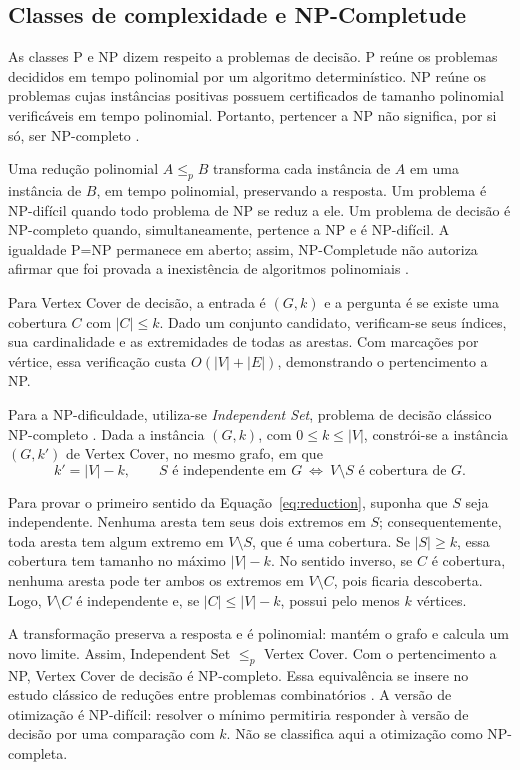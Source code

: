 \subsection{Classes de complexidade e NP-Completude}

As classes P e NP dizem respeito a problemas de decisão. P reúne os
problemas decididos em tempo polinomial por um algoritmo determinístico.
NP reúne os problemas cujas instâncias positivas possuem certificados de
tamanho polinomial verificáveis em tempo polinomial. Portanto, pertencer
a NP não significa, por si só, ser NP-completo \cite{garey1979,cormen2022}.

Uma redução polinomial $A\leq_p B$ transforma cada instância de $A$ em uma
instância de $B$, em tempo polinomial, preservando a resposta.
Um problema é NP-difícil quando todo problema de NP se reduz a ele.
Um problema de decisão é NP-completo quando, simultaneamente, pertence
a NP e é NP-difícil. A igualdade P=NP permanece em aberto; assim,
NP-Completude não autoriza afirmar que foi provada a inexistência de
algoritmos polinomiais \cite{garey1979}.

Para Vertex Cover de decisão, a entrada é $(G,k)$ e a pergunta é se existe
uma cobertura $C$ com $|C|\leq k$. Dado um conjunto candidato,
verificam-se seus índices, sua cardinalidade e as extremidades de todas
as arestas. Com marcações por vértice, essa verificação custa
$O(|V|+|E|)$, demonstrando o pertencimento a NP.

Para a NP-dificuldade, utiliza-se \emph{Independent Set}, problema de
decisão clássico NP-completo \cite{garey1979}. Dada a instância $(G,k)$,
com $0\leq k\leq |V|$, constrói-se a instância $(G,k')$ de Vertex Cover,
no mesmo grafo, em que
\begin{equation}
  k'=|V|-k,\qquad
  S\text{ é independente em }G
  \ \Longleftrightarrow\
  V\setminus S\text{ é cobertura de }G .
  \label{eq:reduction}
\end{equation}

Para provar o primeiro sentido da Equação~\eqref{eq:reduction},
suponha que $S$ seja independente.
Nenhuma aresta tem seus dois extremos em $S$; consequentemente, toda
aresta tem algum extremo em $V\setminus S$, que é uma cobertura.
Se $|S|\geq k$, essa cobertura tem tamanho no máximo $|V|-k$.
No sentido inverso, se $C$ é cobertura, nenhuma aresta pode ter ambos
os extremos em $V\setminus C$, pois ficaria descoberta. Logo,
$V\setminus C$ é independente e, se $|C|\leq |V|-k$, possui pelo menos
$k$ vértices.

A transformação preserva a resposta e é polinomial: mantém o grafo e
calcula um novo limite. Assim,
Independent Set $\leq_p$ Vertex Cover. Com o pertencimento a NP,
Vertex Cover de decisão é NP-completo. Essa equivalência se insere no
estudo clássico de reduções entre problemas combinatórios
\cite{karp1972,garey1979}. A versão de otimização é NP-difícil:
resolver o mínimo permitiria responder à versão de decisão por uma
comparação com $k$. Não se classifica aqui a otimização como
NP-completa.

